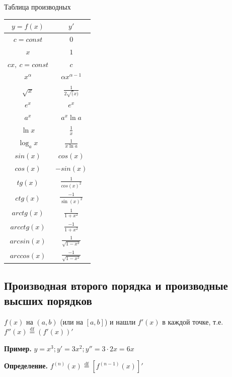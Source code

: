 \documentclass{article}
\begin{document}
    \begin{center}
        Таблица производных\\
        \begin{tabular}{ |c|c| }
            \hline
            \( y = f(x) \) & \( y' \) \\
            \hline
            \( c = const \) & \( 0 \)\\            
            \( x \) & \( 1 \)\\
            \( cx,\ c = const \) & \( c \)\\
            \( x^\alpha \) & \( \alpha x^{\alpha - 1} \)\\
            \( \sqrt{x} \) & \( \frac{1}{2\sqrt(x)} \)\\
            \( e^x \) & \( e^x \)\\
            \( a^x \) & \( a^x\ln a \)\\
            \( \ln x \) & \( \frac{1}{x} \)\\
            \( \log_a x \) & \( \frac{1}{x\ln a} \)\\
            \( sin(x) \) & \( cos(x) \)\\
            \( cos(x) \) & \( -sin(x) \)\\
            \( tg(x) \) & \( \frac{1}{cos(x)^2} \)\\
            \( ctg(x) \) & \( \frac{-1}{\sin(x)^2} \)\\
            \( arctg(x) \) & \( \frac{1}{1 + x^2} \)\\
            \( arcctg(x) \) & \( \frac{-1}{1 + x^2} \)\\
            \( arcsin(x) \) & \( \frac{1}{\sqrt{1 - x^2}} \)\\
            \( arccos(x) \) & \( \frac{-1}{\sqrt{1 - x^2}} \)\\
            \hline
        \end{tabular}
    \end{center}

    \subsection{Производная второго порядка и производные высших порядков}

    \( f(x) \) на \((a, b)\) (или на \([a, b]\)) и нашли \( f'(x) \) в каждой точке, т.е. \(f''(x) \stackrel{\text{df}}{=} (f'(x))' \)

    \textbf{Пример.} \( y = x^3; y' = 3x^2; y'' = 3\cdot 2x = 6x\)

    \textbf{Определение.} \( f^{(n)}(x) \stackrel{\text{df}}{=} [f^{(n - 1)}(x)]' \)
\end{document}
